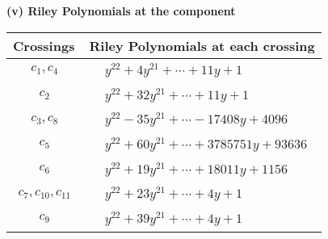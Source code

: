 \documentclass[1p]{elsarticle_modified}
\theoremstyle{definition}
\begin{document}
\newpage\renewcommand{\arraystretch}{1}
\flushleft \textbf{(v) Riley Polynomials at the component}\newline \\
\begin{tabular}{m{50pt}|m{274pt}}
Crossings & \hspace{64pt}Riley Polynomials at each crossing \\
\hline $$\begin{aligned}c_{1},c_{4}\end{aligned}$$&$\begin{aligned}
&y^{22}+4 y^{21}+\cdots+11 y+1
\end{aligned}$\\
\hline $$\begin{aligned}c_{2}\end{aligned}$$&$\begin{aligned}
&y^{22}+32 y^{21}+\cdots+11 y+1
\end{aligned}$\\
\hline $$\begin{aligned}c_{3},c_{8}\end{aligned}$$&$\begin{aligned}
&y^{22}-35 y^{21}+\cdots-17408 y+4096
\end{aligned}$\\
\hline $$\begin{aligned}c_{5}\end{aligned}$$&$\begin{aligned}
&y^{22}+60 y^{21}+\cdots+3785751 y+93636
\end{aligned}$\\
\hline $$\begin{aligned}c_{6}\end{aligned}$$&$\begin{aligned}
&y^{22}+19 y^{21}+\cdots+18011 y+1156
\end{aligned}$\\
\hline $$\begin{aligned}c_{7},c_{10},c_{11}\end{aligned}$$&$\begin{aligned}
&y^{22}+23 y^{21}+\cdots+4 y+1
\end{aligned}$\\
\hline $$\begin{aligned}c_{9}\end{aligned}$$&$\begin{aligned}
&y^{22}+39 y^{21}+\cdots+4 y+1
\end{aligned}$\\
\hline
\end{tabular}\\~\\
\end{document}
